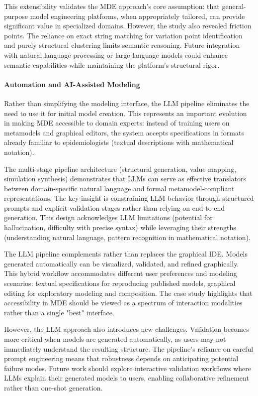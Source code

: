 This extensibility validates the MDE approach's core assumption: that general-purpose model engineering platforms, when appropriately tailored, can provide significant value in specialized domains. However, the study also revealed friction points. The reliance on exact string matching for variation point identification and purely structural clustering limits semantic reasoning. Future integration with natural language processing or large language models could enhance semantic capabilities while maintaining the platform's structural rigor.

\paragraph{Automation and AI-Assisted Modeling}

Rather than simplifying the modeling interface, the LLM pipeline eliminates the need to use it for initial model creation. This represents an important evolution in making MDE accessible to domain experts: instead of training users on metamodels and graphical editors, the system accepts specifications in formats already familiar to epidemiologists (textual descriptions with mathematical notation).

The multi-stage pipeline architecture (structural generation, value mapping, simulation synthesis) demonstrates that LLMs can serve as effective translators between domain-specific natural language and formal metamodel-compliant representations. The key insight is constraining LLM behavior through structured prompts and explicit validation stages rather than relying on end-to-end generation. This design acknowledges LLM limitations (potential for hallucination, difficulty with precise syntax) while leveraging their strengths (understanding natural language, pattern recognition in mathematical notation).

The LLM pipeline complements rather than replaces the graphical IDE. Models generated automatically can be visualized, validated, and refined graphically. This hybrid workflow accommodates different user preferences and modeling scenarios: textual specifications for reproducing published models, graphical editing for exploratory modeling and composition. The case study highlights that accessibility in MDE should be viewed as a spectrum of interaction modalities rather than a single "best" interface.

However, the LLM approach also introduces new challenges. Validation becomes more critical when models are generated automatically, as users may not immediately understand the resulting structure. The pipeline's reliance on careful prompt engineering means that robustness depends on anticipating potential failure modes. Future work should explore interactive validation workflows where LLMs explain their generated models to users, enabling collaborative refinement rather than one-shot generation.

